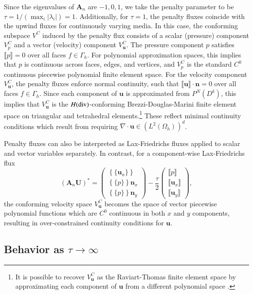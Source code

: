 \documentclass[preprint,10pt]{elsarticle}
\newcommand{\LRp}[1]{\left( #1 \right)}
\newcommand{\LRc}[1]{\left\{ #1 \right\}}
\newcommand{\Div} {\ensuremath{\nabla\cdot}}
\newcommand{\jump}[1] {\ensuremath{\llbracket#1\rrbracket}}
\newcommand{\avg}[1] {\ensuremath{\LRc{\!\{#1\}\!}}}
\newcommand{\Gh}{\Gamma_h}
\newcommand{\Oh}{\Omega_h}
\newcommand{\note}[1]{#1}
\begin{document}
Since the eigenvalues of $\bm{A}_n$ are $-1,0,1$, we take the penalty parameter to be $\tau = 1 / (\max_i |\lambda_i|) = 1$.   Additionally, for $\tau = 1$, the penalty fluxes coincide with the upwind fluxes for continuously varying media.  In this case, the conforming subspace $V^{C}$ induced by the penalty flux consists of a scalar (pressure) component $V^C_p$ and a vector (velocity) component $V^C_{\bm{u}}$.  The pressure component $p$ satisfies $\jump{p} = 0$ over all faces $f\in \Gh$.  For polynomial approximation spaces, this implies that $p$ is continuous across faces, edges, and vertices, and $V^C_p$ is the standard $C^0$ continuous piecewise polynomial finite element space.  For the velocity component $V_{\bm{u}}^C$, the penalty fluxes enforce normal continuity, such that $\jump{\bm{u}}\cdot \bm{n} = 0$ over all faces $f \in \Gh$.  Since each component of $\bm{u}$ is approximated from $P^N(D^k)$, this implies that $V^C_{\bm{u}}$ is the $H({\rm div})$-conforming Brezzi-Douglas-Marini finite element space \cite{brezzi1985two,boffi2013mixed} \note{on triangular and tetrahedral elements}.\footnote{It is possible to recover $V^C_{\bm{u}}$ as the Raviart-Thomas finite element space by approximating each component of $\bm{u}$ from a different polynomial space \cite{kirby2004algorithm}.}   These reflect minimal continuity conditions which result from requiring $\Div \bm{u} \in \LRp{L^2\LRp{\Oh}}^d$.

Penalty fluxes can also be interpreted as Lax-Friedrichs fluxes applied to scalar and vector variables separately.  In contrast, for a component-wise Lax-Friedrichs flux 
\[
(\bm{A}_n\bm{U})^* = \left(\begin{array}{c}
\avg{\bm{u}_n}\\
\avg{p }\bm{n}_x\\
\avg{p }\bm{n}_y
\end{array}
\right) - 
\frac{\tau}{2}\left(\begin{array}{c}
\jump{p}\\
\jump{\bm{u}_x}\\
\jump{\bm{u}_y}
\end{array}
\right),
\]
the conforming velocity space $V^C_{\bm{u}}$ becomes the space of vector piecewise polynomial functions which are $C^0$ continuous in both $x$ and $y$ components, resulting in over-constrained continuity conditions for $\bm{u}$.

\subsection{Behavior as $\tau\rightarrow\infty$}
\end{document}
